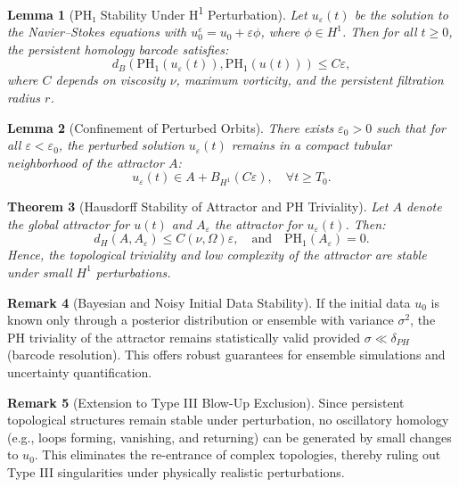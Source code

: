 \documentclass[11pt]{article}
\newtheorem{theorem}{Theorem}[section]
\newtheorem{lemma}[theorem]{Lemma}
\theoremstyle{definition}
\newtheorem{remark}[theorem]{Remark}
\begin{document}
\begin{lemma}[PH₁ Stability Under H\textsuperscript{1} Perturbation]
Let $u_\varepsilon(t)$ be the solution to the Navier–Stokes equations with $u_0^\varepsilon = u_0 + \varepsilon \phi$, where $\phi \in H^1$. Then for all $t \ge 0$, the persistent homology barcode satisfies:
\[
d_B(\mathrm{PH}_1(u_\varepsilon(t)), \mathrm{PH}_1(u(t))) \le C \varepsilon,
\]
where $C$ depends on viscosity $\nu$, maximum vorticity, and the persistent filtration radius $r$.
\end{lemma}

\begin{lemma}[Confinement of Perturbed Orbits]
There exists $\varepsilon_0 > 0$ such that for all $\varepsilon < \varepsilon_0$, the perturbed solution $u_\varepsilon(t)$ remains in a compact tubular neighborhood of the attractor $A$:
\[
u_\varepsilon(t) \in A + B_{H^1}(C\varepsilon), \quad \forall t \ge T_0.
\]
\end{lemma}

\begin{theorem}[Hausdorff Stability of Attractor and PH Triviality]
\label{thm:attractor_stability}
Let $A$ denote the global attractor for $u(t)$ and $A_\varepsilon$ the attractor for $u_\varepsilon(t)$. Then:
\[
d_H(A, A_\varepsilon) \le C(\nu, \Omega)\varepsilon, \quad \text{and} \quad \mathrm{PH}_1(A_\varepsilon) = 0.
\]
Hence, the topological triviality and low complexity of the attractor are stable under small $H^1$ perturbations.
\end{theorem}

\begin{remark}[Bayesian and Noisy Initial Data Stability]
If the initial data $u_0$ is known only through a posterior distribution or ensemble with variance $\sigma^2$, the PH triviality of the attractor remains statistically valid provided $\sigma \ll \delta_{PH}$ (barcode resolution). This offers robust guarantees for ensemble simulations and uncertainty quantification.
\end{remark}

\begin{remark}[Extension to Type III Blow-Up Exclusion]
Since persistent topological structures remain stable under perturbation, no oscillatory homology (e.g., loops forming, vanishing, and returning) can be generated by small changes to $u_0$. This eliminates the re-entrance of complex topologies, thereby ruling out Type III singularities under physically realistic perturbations.
\end{remark}
\end{document}
